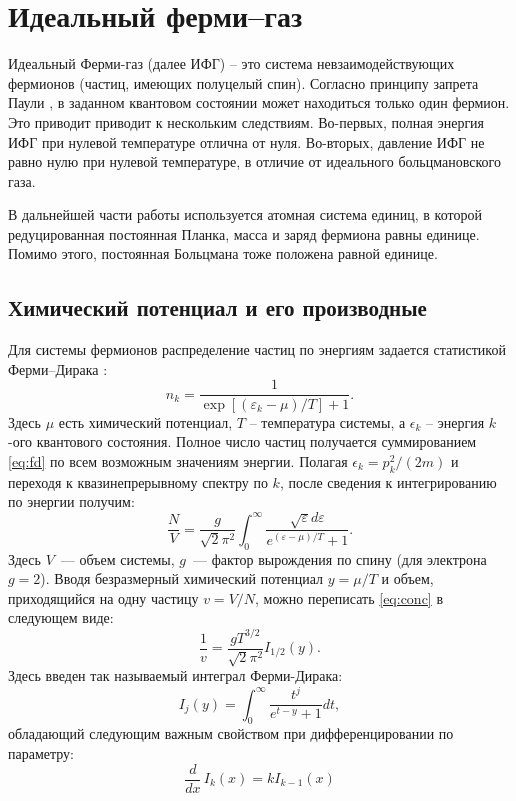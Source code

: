 \chapter{Идеальный ферми--газ}
Идеальный Ферми-газ (далее ИФГ) -- это система невзаимодействующих фермионов (частиц, имеющих полуцелый спин).
Согласно принципу запрета Паули \cite{Pauli:ZP:1925,Pauli:PR:1940}, в заданном квантовом состоянии может находиться только один фермион.
Это приводит приводит к нескольким следствиям.
Во-первых, полная энергия ИФГ при нулевой температуре отлична от нуля.
Во-вторых, давление ИФГ не равно нулю при нулевой температуре, в отличие от идеального больцмановского газа.

В дальнейшей части работы используется атомная система единиц, в которой редуцированная постоянная Планка, масса и заряд фермиона равны единице.
Помимо этого, постоянная Больцмана тоже положена равной единице.

\section{Химический потенциал и его производные}
Для системы фермионов распределение частиц по энергиям задается статистикой Ферми--Дирака \cite{Landau:statmech:1958}:
\begin{equation}
    n_k = \frac{1}{\exp{[(\varepsilon_k - \mu)/T]} + 1}.
    \label{eq:fd}
\end{equation}
Здесь $\mu$ есть химический потенциал, $T$ -- температура системы, а $\epsilon_k$ -- энергия $k$-ого квантового состояния.
Полное число частиц получается суммированием \eqref{eq:fd} по всем возможным значениям энергии.
Полагая $\epsilon_k = p^2_{k} / (2m)$ и переходя к квазинепрерывному спектру по $k$, после сведения к интегрированию по энергии получим:
\begin{equation}
    \label{eq:conc}
    \frac{N}{V}=\frac{g}{\sqrt{2} \pi^{2}} \int_{0}^{\infty} \frac{\sqrt{\varepsilon} d \varepsilon}{e^{(\varepsilon-\mu) / T}+1}.
\end{equation}
Здесь $V$~--- объем системы, $g$~--- фактор вырождения по спину (для электрона $g = 2$).
Вводя безразмерный химический потенциал $y = \mu / T$ и объем, приходящийся на одну частицу $v = V / N$, можно переписать \eqref{eq:conc} в следующем виде:
\begin{equation}
    \frac{1}{v} = \frac{g T^{3/2}}{\sqrt{2}\pi^2}I_{1/2}(y).
    \label{eq:mu_equation}
\end{equation}
Здесь введен так называемый интеграл Ферми-Дирака:
\begin{equation}
    \label{eq:fermi-dirak_integral_definition}
    I_{j}(y)= \int_{0}^{\infty} \frac{t^{j}}{e^{t-y}+1} dt,
\end{equation}
обладающий следующим важным свойством при дифференцировании по параметру:
\begin{equation}
    \label{eq:ifg_diff_rule}
    \frac{d}{dx}\, I_k (x) = k I _{k-1} (x)
\end{equation}

